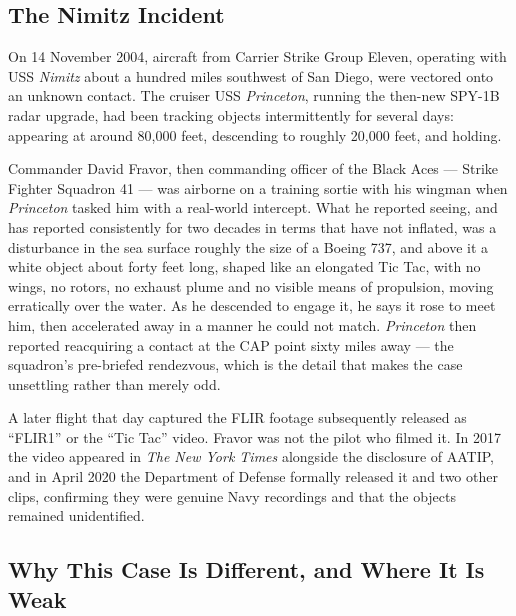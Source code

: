 \subsection{The Nimitz Incident}

On 14 November 2004, aircraft from Carrier Strike Group Eleven, operating with USS \emph{Nimitz}
about a hundred miles southwest of San Diego, were vectored onto an unknown contact. The cruiser USS
\emph{Princeton}, running the then-new SPY-1B radar upgrade, had been tracking objects intermittently
for several days: appearing at around 80,000 feet, descending to roughly 20,000 feet, and holding.

Commander David Fravor, then commanding officer of the Black Aces --- Strike Fighter Squadron 41 ---
was airborne on a training sortie with his wingman when \emph{Princeton} tasked him with a real-world
intercept. What he reported seeing, and has reported consistently for two decades in terms that have
not inflated, was a disturbance in the sea surface roughly the size of a Boeing 737, and above it a
white object about forty feet long, shaped like an elongated Tic Tac, with no wings, no rotors, no
exhaust plume and no visible means of propulsion, moving erratically over the water. As he descended
to engage it, he says it rose to meet him, then accelerated away in a manner he could not match.
\emph{Princeton} then reported reacquiring a contact at the CAP point sixty miles away --- the
squadron's pre-briefed rendezvous, which is the detail that makes the case unsettling rather than
merely odd.

A later flight that day captured the FLIR footage subsequently released as ``FLIR1'' or the ``Tic
Tac'' video. Fravor was not the pilot who filmed it. In 2017 the video appeared in \emph{The New York
Times} alongside the disclosure of AATIP, and in April 2020 the Department of Defense formally
released it and two other clips, confirming they were genuine Navy recordings and that the objects
remained unidentified.

\subsection{Why This Case Is Different, and Where It Is Weak}

